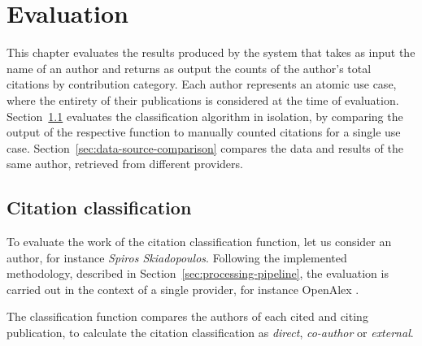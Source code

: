 
\chapter{Evaluation} \label{c5:evaluation}

This chapter evaluates the results produced by the system that takes as input the name of an author and returns as output the counts of the author's total citations by contribution category.
Each author represents an atomic use case, where the entirety of their publications is considered at the time of evaluation.
Section~\ref{sec:classification-checks} evaluates the classification algorithm in isolation, by comparing the output of the respective function to manually counted citations for a single use case.
Section~\ref{sec:data-source-comparison} compares the data and results of the same author, retrieved from different providers.

\section{Citation classification} \label{sec:classification-checks}

To evaluate the work of the citation classification function, let us consider an author, for instance \emph{Spiros Skiadopoulos}.
Following the implemented methodology, described in Section~\ref{sec:processing-pipeline}, the evaluation is carried out in the context of a single provider, for instance \textsf{OpenAlex} .

The classification function compares the authors of each cited and citing publication, to calculate the citation classification as \emph{direct}, \emph{co-author} or \emph{external}.

